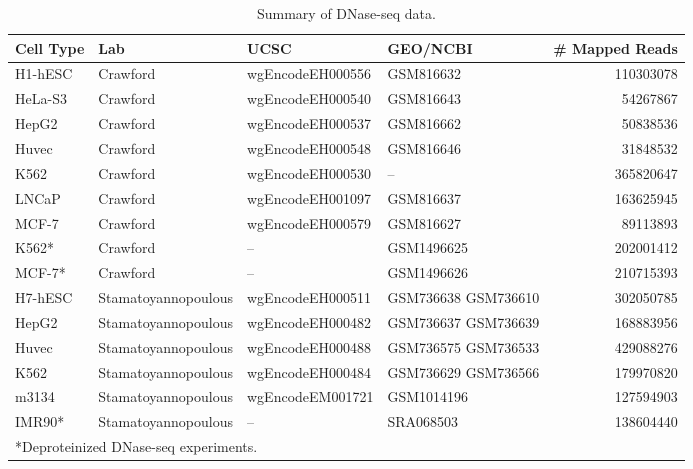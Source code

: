 \documentclass[11pt]{article}
\begin{document}
\begin{table}[h]
\begin{center}
\caption{Summary of DNase-seq data.}
\label{tab:dataencode}
\renewcommand{\arraystretch}{1.2}
\begin{tabularx}{\textwidth}{ lllXr }
\hline
Cell Type & Lab                 & UCSC             & GEO/NCBI                     & \# Mapped Reads \\
\hline
H1-hESC   & Crawford            & wgEncodeEH000556 & GSM816632                    & 110303078       \\
HeLa-S3   & Crawford            & wgEncodeEH000540 & GSM816643                    & 54267867        \\
HepG2     & Crawford            & wgEncodeEH000537 & GSM816662                    & 50838536        \\
Huvec     & Crawford            & wgEncodeEH000548 & GSM816646                    & 31848532        \\
K562      & Crawford            & wgEncodeEH000530 & --                           & 365820647       \\
LNCaP     & Crawford            & wgEncodeEH001097 & GSM816637                    & 163625945       \\
MCF-7     & Crawford            & wgEncodeEH000579 & GSM816627                    & 89113893        \\
K562*     & Crawford            & --               & GSM1496625                   & 202001412       \\
MCF-7*    & Crawford            & --               & GSM1496626                   & 210715393       \\
H7-hESC   & Stamatoyannopoulous & wgEncodeEH000511 & GSM736638 \newline GSM736610 & 302050785       \\
HepG2     & Stamatoyannopoulous & wgEncodeEH000482 & GSM736637 \newline GSM736639 & 168883956       \\
Huvec     & Stamatoyannopoulous & wgEncodeEH000488 & GSM736575 \newline GSM736533 & 429088276       \\
K562      & Stamatoyannopoulous & wgEncodeEH000484 & GSM736629 \newline GSM736566 & 179970820       \\
m3134     & Stamatoyannopoulous & wgEncodeEM001721 & GSM1014196                   & 127594903       \\
IMR90*    & Stamatoyannopoulous & --               & SRA068503                    & 138604440       \\
\hline
\multicolumn{5}{l}{*Deproteinized DNase-seq experiments.} \\
\end{tabularx}
\end{center}
\end{table}
\end{document}
